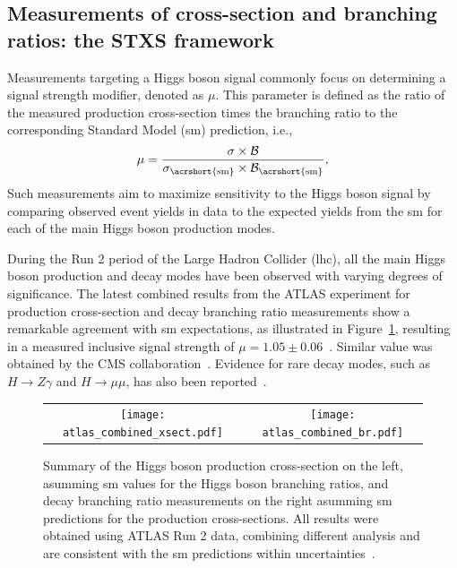 \subsection{Measurements of cross-section and branching ratios: the STXS framework}
\label{sec:stxs_yukawa}


Measurements targeting a Higgs boson signal commonly focus on determining a signal strength modifier, denoted as $\mu$. This parameter is defined as the ratio of the measured production cross-section times the branching ratio to the corresponding Standard Model (\acrshort{sm}) prediction, i.e.,
\begin{equation}
\label{signal_strength}
    \mu = \frac{\sigma \times \mathcal{B}}{\sigma_{\mathrm{\acrshort{sm}}} \times \mathcal{B}_{\mathrm{\acrshort{sm}}}},
\end{equation}
Such measurements aim to maximize sensitivity to the Higgs boson signal by comparing observed event yields in data to the expected yields from the \acrshort{sm} for each of the main Higgs boson production modes.

During the Run 2 period of the Large Hadron Collider (\acrshort{lhc}), all the main Higgs boson production and decay modes have been observed with varying degrees of significance. The latest combined results from the ATLAS experiment for production cross-section and decay branching ratio measurements show a remarkable agreement with \acrshort{sm} expectations, as illustrated in Figure~\ref{higgs_mu}, resulting in a measured inclusive signal strength of $\mu = 1.05 \pm 0.06$~\cite{Nature_ATLAS}. Similar value was obtained by the CMS collaboration~\cite{CMS:2022dwd}. Evidence for rare decay modes, such as $H \to Z\gamma$ and $H \to \mu\mu$, has also been reported~\cite{Aad_2024,muon2021}.

\begin{figure}[htbp]
    \centering
    \begin{tabular}{cc}
    \texttt{[image: atlas\_combined\_xsect.pdf]} & 
    \texttt{[image: atlas\_combined\_br.pdf]}
    \end{tabular}
    \caption{Summary of the Higgs boson production cross-section on the left, asumming \acrshort{sm} values for the Higgs boson branching ratios, and decay branching ratio measurements on the right asumming \acrshort{sm} predictions for the production cross-sections. All results were obtained using ATLAS Run 2 data, combining different analysis and are consistent with the \acrshort{sm} predictions within uncertainties~\cite{Nature_ATLAS}.}
    \label{higgs_mu}
\end{figure}

